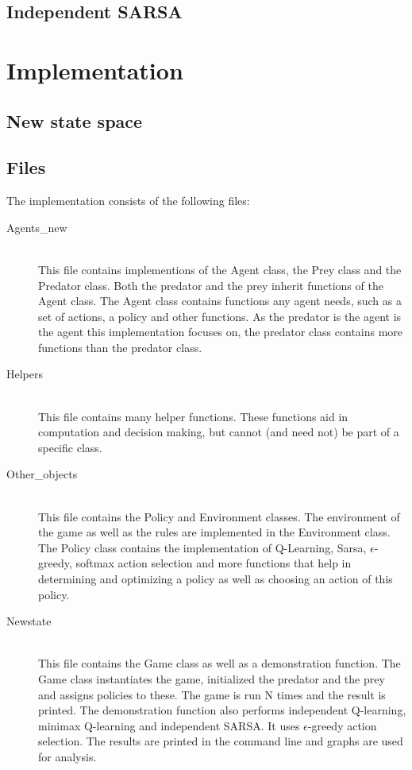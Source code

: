 \documentclass{article}
\begin{document}
\subsection{Independent SARSA}


\section{Implementation}

\subsection{New state space}


\subsection{Files}

The implementation consists of the following files:
\begin{description}
	\item[Agents\_new] \hfill \\ 
	This file contains implementions of the Agent class, the Prey class and the Predator class. Both the predator and the prey inherit functions of the Agent class. The Agent class contains functions any agent needs, such as a set of actions, a policy and other functions. As the predator is the agent is the agent this implementation focuses on, the predator class contains more functions than the predator class.
	
	\item[Helpers] \hfill \\ 
	This file contains many helper functions. These functions aid in computation and decision making, but cannot (and need not) be part of a specific class.
	
	\item[Other\_objects] \hfill \\ %
	This file contains the Policy and Environment classes. The environment of the game as well as the rules are implemented in the Environment class. The Policy class contains the implementation of Q-Learning, Sarsa, $\epsilon$-greedy, softmax action selection and more functions that help in determining and optimizing a policy as well as choosing an action of this policy.
	\item[Newstate] \hfill \\ 
	This file contains the Game class as well as a demonstration function. The Game class instantiates the game, initialized the predator and the prey and assigns policies to these. The game is run N times and the result is printed. The demonstration function also performs independent Q-learning, minimax Q-learning and independent SARSA. It uses $\epsilon$-greedy action selection. The results are printed in the command line and graphs are used for analysis.
\end{description}
\end{document}
